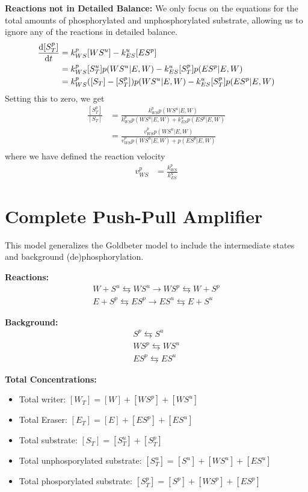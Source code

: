 \documentclass[aps,onecolumn,superscriptaddress,notitlepage]{revtex4-1}
\begin{document}
\textbf{Reactions not in  Detailed Balance:}
We only focus on the equations for the total amounts of phosphorylated and unphosphorylated substrate, allowing us to ignore any of the reactions in detailed balance.
\begin{align}
\dv{[S^p_T]}{t} &= k_{WS}^p[WS^u] - k_{ES}^u[ES^p]\\
&= k_{WS}^p[S^u_T]p(WS^u|E, W) - k_{ES}^u[S^p_T]p(ES^p|E, W)\\
&= k_{WS}^p([S_T]-[S^p_T])p(WS^u|E, W) - k_{ES}^u[S^p_T]p(ES^p|E, W)
\end{align}
Setting this to zero, we get
\begin{align}
\frac{[S_T^p]}{[S_T]} &= \frac{k_{WS}^p p(WS^u|E,W)}{k_{WS}^p p(WS^u|E,W) + k_{ES}^u p(ES^p|E,W)}\\
 &= \frac{v_{WS}^p p(WS^u|E,W)}{v_{WS}^p p(WS^u|E,W) + p(ES^p|E,W)}\\
\end{align}
where we have defined the reaction velocity
\begin{align}
v_{WS}^p &= \frac{k_{WS}^p}{k_{ES}^u}
\end{align}


\section{Complete Push-Pull Amplifier}

This model generalizes the Goldbeter model to include the intermediate states and background (de)phosphorylation.

\textbf{Reactions:}
\begin{gather}
W + S^u \leftrightarrows WS^u \rightarrow WS^p \leftrightarrows W + S^p\\
E + S^p \leftrightarrows ES^p \rightarrow ES^u \leftrightarrows E + S^u
\end{gather}

\textbf{Background:}
\begin{gather}
S^p \leftrightarrows S^u\\
WS^p  \leftrightarrows WS^u\\
ES^p  \leftrightarrows ES^u
\end{gather}


\textbf{Total Concentrations:}
\begin{itemize}
\item Total writer: $[W_T] = [W] + [WS^p] + [WS^u]$
\item Total Eraser: $[E_T] = [E]  + [ES^p] + [ES^u]$
\item Total substrate: $[S_T] = [S^u_T] + [S^p_T]$
\item Total unphosporylated substrate: $[S^u_T] = [S^u] + [WS^u] + [ES^u]$
\item Total phosporylated substrate: $[S^p_T] = [S^p] + [WS^p] + [ES^p]$
\end{itemize}
\end{document}
